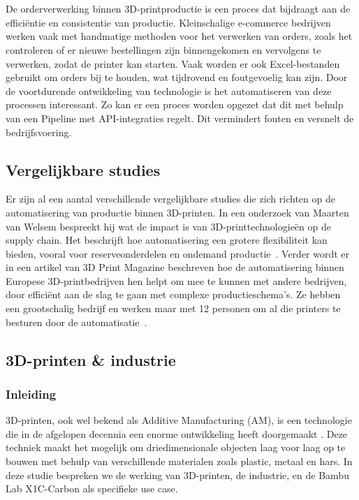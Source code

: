 \chapter{}%
\label{ch:stand-van-zaken}

De orderverwerking binnen 3D-printproductie is een proces dat bijdraagt aan de efficiëntie en consistentie van productie. Kleinschalige e-\-commerce bedrijven werken vaak met handmatige methoden voor het verwerken van orders, zoals het controleren of er  nieuwe bestellingen zijn binnengekomen en vervolgens te verwerken, zodat de printer kan starten. Vaak worden er ook Excel-bestanden gebruikt om orders bij te houden, wat tijdrovend en foutgevoelig kan zijn. Door de voortdurende ontwikkeling van technologie is het automatiseren van deze processen interessant. Zo kan er een proces worden opgezet dat dit met behulp van een Pipeline met API-integraties regelt. Dit vermindert fouten en versnelt de bedrijfsvoering. 

\section{Vergelijkbare studies}%
\label{sec:Vergelijkbare studie}

Er zijn al een aantal verschillende vergelijkbare studies die zich richten op de automatisering van productie binnen 3D-printen. In een onderzoek van Maarten van Welsem bespreekt hij wat de impact is van 3D-printtechnologieën op de supply chain. Het beschrijft hoe automatisering een grotere flexibiliteit kan bieden, vooral voor reserveonderdelen en ondemand productie~\autocite{emerce3DprintSupplyChain}. Verder wordt er in een artikel van 3D Print Magazine beschreven hoe de automatisering binnen Europese 3D-printbedrijven hen helpt om mee te kunnen met andere bedrijven, door efficiënt aan de slag te gaan met complexe productieschema's. Ze hebben een grootschalig bedrijf en werken maar met 12 personen om al die printers te besturen door de automatisatie~\autocite{3dprintmagAutomation}. 

\newpage

\section{3D-printen \& industrie}%
\label{sec:3D-printen & industrie}

\subsection{Inleiding}
3D-printen, ook wel bekend als Additive Manufacturing (AM), is een technologie die in de afgelopen decennia een enorme ontwikkeling heeft doorgemaakt \autocite{3dPrintingIndustry}. Deze techniek maakt het mogelijk om driedimensionale objecten laag voor laag op te bouwen met behulp van verschillende materialen zoals plastic, metaal en hars. In deze studie bespreken we de werking van 3D-printen, de industrie, en de Bambu Lab X1C-Carbon als specifieke use case.

